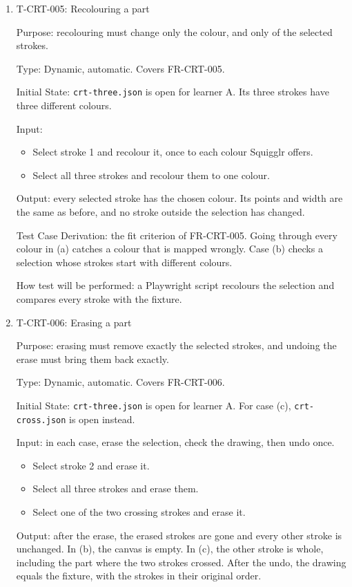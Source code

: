 \documentclass[12pt, titlepage]{article}
\newcommand{\testitem}[1]{\item #1\par\nopagebreak}
\begin{document}
\begin{enumerate}
\testitem{T-CRT-005: Recolouring a part}

Purpose: recolouring must change only the colour, and only of the selected
strokes.

Type: Dynamic, automatic. Covers FR-CRT-005.

Initial State: \texttt{crt-three.json} is open for learner A. Its three
strokes have three different colours.

Input:
\begin{itemize}
\item[(a)] Select stroke 1 and recolour it, once to each colour Squigglr
offers.
\item[(b)] Select all three strokes and recolour them to one colour.
\end{itemize}

Output: every selected stroke has the chosen colour. Its points and width are
the same as before, and no stroke outside the selection has changed.

Test Case Derivation: the fit criterion of FR-CRT-005. Going through every
colour in (a) catches a colour that is mapped wrongly. Case (b) checks a
selection whose strokes start with different colours.

How test will be performed: a Playwright script recolours the selection and
compares every stroke with the fixture.

\testitem{T-CRT-006: Erasing a part}

Purpose: erasing must remove exactly the selected strokes, and undoing the
erase must bring them back exactly.

Type: Dynamic, automatic. Covers FR-CRT-006.

Initial State: \texttt{crt-three.json} is open for learner A. For case (c),
\texttt{crt-cross.json} is open instead.

Input: in each case, erase the selection, check the drawing, then undo once.
\begin{itemize}
\item[(a)] Select stroke 2 and erase it.
\item[(b)] Select all three strokes and erase them.
\item[(c)] Select one of the two crossing strokes and erase it.
\end{itemize}

Output: after the erase, the erased strokes are gone and every other stroke
is unchanged. In (b), the canvas is empty. In (c), the other stroke is whole,
including the part where the two strokes crossed. After the undo, the
drawing equals the fixture, with the strokes in their original order.


\end{enumerate}
\end{document}
